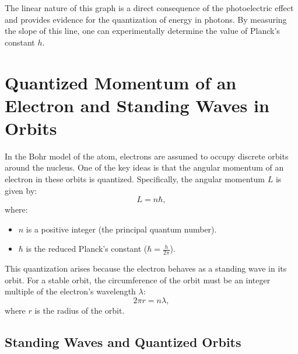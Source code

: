 \documentclass{report}
\begin{document}
The linear nature of this graph is a direct consequence of the photoelectric effect and provides evidence for the quantization of energy in photons. By measuring the slope of this line, one can experimentally determine the value of Planck's constant $h$.

\section{Quantized Momentum of an Electron and Standing Waves in Orbits}

In the Bohr model of the atom, electrons are assumed to occupy discrete orbits around the nucleus. One of the key ideas is that the angular momentum of an electron in these orbits is quantized. Specifically, the angular momentum $L$ is given by:
\[
	L = n \hbar,
\]
where:
\begin{itemize}
	\item $n$ is a positive integer (the principal quantum number).
	\item $\hbar$ is the reduced Planck's constant ($\hbar = \frac{h}{2\pi}$).
\end{itemize}

This quantization arises because the electron behaves as a standing wave in its orbit. For a stable orbit, the circumference of the orbit must be an integer multiple of the electron's wavelength $\lambda$:
\[
	2 \pi r = n \lambda,
\]
where $r$ is the radius of the orbit.


\begin{center}
\end{center}

\subsection{Standing Waves and Quantized Orbits}
\end{document}
